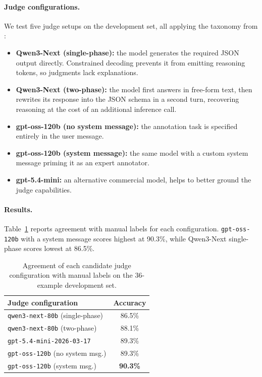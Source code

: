 \documentclass[11pt]{article}
\begin{document}
\paragraph{Judge configurations.}
We test five judge setups on the development set, all applying the taxonomy from :
\begin{itemize}
  \item \textbf{Qwen3-Next (single-phase):} the model generates the required JSON output directly. Constrained decoding prevents it from emitting reasoning tokens, so judgments lack explanations.
  \item \textbf{Qwen3-Next (two-phase):} the model first answers in free-form text, then rewrites its response into the JSON schema in a second turn, recovering reasoning at the cost of an additional inference call.
  \item \textbf{gpt-oss-120b (no system message):} the annotation task is specified entirely in the user message.
  \item \textbf{gpt-oss-120b (system message):} the same model with a custom system message priming it as an expert annotator.
  \item \textbf{gpt-5.4-mini:} an alternative commercial model, helps to better ground the judge capabilities.
\end{itemize}

\paragraph{Results.}
Table~\ref{tab:judge_accuracy} reports agreement with manual labels for each configuration. \texttt{gpt-oss-120b} with a system message scores highest at 90.3\%, while Qwen3-Next single-phase scores lowest at 86.5\%.

\begin{table}[t]
\centering
\begin{tabular}{lc}
\toprule
\textbf{Judge configuration} & \textbf{Accuracy} \\
\midrule
\texttt{qwen3-next-80b} (single-phase)     & 86.5\% \\
\texttt{qwen3-next-80b} (two-phase)        & 88.1\% \\
\texttt{gpt-5.4-mini-2026-03-17}                  & 89.3\% \\
\texttt{gpt-oss-120b} (no system msg.) & 89.3\% \\
\texttt{gpt-oss-120b} (system msg.)    & \textbf{90.3\%} \\
\bottomrule
\end{tabular}
\caption{Agreement of each candidate judge configuration with manual labels on the 36-example development set.}
\label{tab:judge_accuracy}
\end{table}
\end{document}
